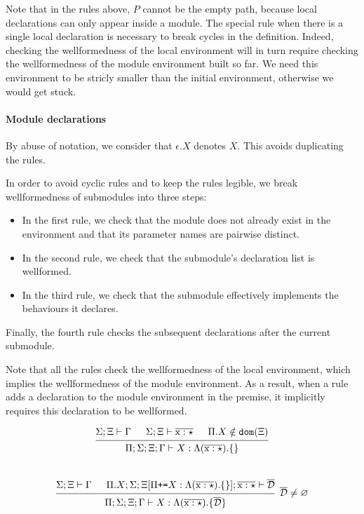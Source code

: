 \documentclass[12pt]{article}
\newcommand{\tx}{\text{\rm x}}
\newcommand{\emptyenv}{\varnothing}
\newcommand{\Gammatop}{\ensuremath{\Xi}}
\newcommand{\Gammabot}{\ensuremath{\Gamma}}
\newcommand{\dom}{\texttt{dom}}
\begin{document}
Note that in the rules above, $P$ cannot be the empty path, because local declarations
can only appear inside a module. The special rule when there is a single local declaration is necessary to break
cycles in the definition.
Indeed, checking the wellformedness of the local environment will in turn
require checking the wellformedness of the module environment built so far.
We need this environment to be stricly smaller than the initial environment, otherwise we would get stuck.

\paragraph{Module declarations}

By abuse of notation, we consider that $\epsilon.X$ denotes $X$. This avoids duplicating the rules.

In order to avoid cyclic rules and to keep the rules legible, we break wellformedness of submodules into three steps:
\begin{itemize}
    \item In the first rule, we check that the module does not already exist
          in the environment and that its parameter names are pairwise distinct.
    \item In the second rule, we check that the submodule's declaration list is wellformed.
    \item In the third rule, we check that the submodule effectively implements the behaviours it declares.
\end{itemize}

Finally, the fourth rule checks the subsequent declarations after the current submodule.

Note that all the rules check the wellformedness of the local environment, which implies the
wellformedness of the module environment.
As a result, when a rule adds a declaration to the module environment in the premise,
it implicitly requires this declaration to be wellformed.

\[
    \begin{prooftree}
        \hypo { \Sigma; \Gammatop \vdash \Gammabot }
        \hypo { \Sigma; \Gammatop \vdash \overline{\tx : \star} }
        \hypo { \Pi.X \notin \dom(\Gammatop) }
        \infer3{ \Pi; \Sigma; \Gammatop; \Gammabot \vdash X : \Lambda (\overline{\tx : \star}). \{\} }
    \end{prooftree}
\] \\

\[
    \begin{prooftree}
        \hypo { \Sigma; \Gammatop \vdash \Gammabot }
        \hypo { \Pi.X; \Sigma; \Gammatop[\Pi \texttt{+=} X : \Lambda(\overline{\tx : \star}). \{\}]; \overline{\tx : \star} \vdash \overline{\mathcal{D}}}
        \infer2[$\overline{\mathcal{D}} \neq \emptyenv$]{ \Pi; \Sigma; \Gammatop; \Gammabot \vdash X : \Lambda (\overline{\tx : \star}). \{ \overline{\mathcal{D}} \} }
    \end{prooftree}
\] \\
\end{document}
